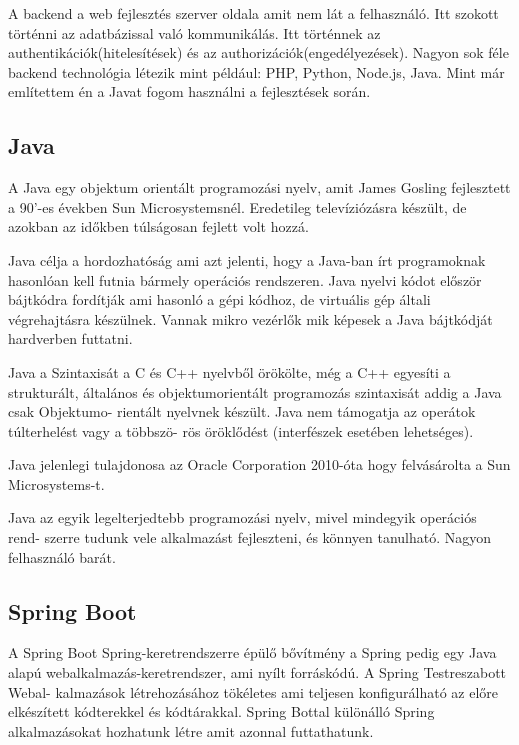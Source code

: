 

A backend a web fejlesztés szerver oldala amit nem lát a felhasználó. Itt szokott történni az adatbázissal való kommunikálás. Itt történnek az authentikációk(hitelesítések) és az authorizációk(engedélyezések). Nagyon sok féle backend technológia létezik mint például: PHP, Python, Node.js, Java. Mint már említettem én a Javat fogom használni a fejlesztések során.

\subsection{Java}

A Java egy objektum orientált programozási nyelv, amit James Gosling fejlesztett a 90’-es években Sun Microsystemsnél. Eredetileg televíziózásra készült, de azokban az időkben túlságosan fejlett volt hozzá.

Java célja a hordozhatóság ami azt jelenti, hogy a Java-ban írt programoknak hasonlóan kell futnia bármely operációs rendszeren. Java nyelvi kódot először bájtkódra fordítják ami hasonló a gépi kódhoz, de virtuális gép általi végrehajtásra készülnek. Vannak mikro vezérlők mik képesek a Java bájtkódját hardverben futtatni.

Java a Szintaxisát a C és C++ nyelvből örökölte, még a C++ egyesíti a strukturált, általános és objektumorientált programozás szintaxisát addig a Java csak Objektumo-
rientált nyelvnek készült. Java nem támogatja az operátok túlterhelést vagy a többszö-
rös öröklődést (interfészek esetében lehetséges).

Java jelenlegi tulajdonosa az Oracle Corporation 2010-óta hogy felvásárolta a Sun Microsystems-t.

Java az egyik legelterjedtebb programozási nyelv, mivel mindegyik operációs rend-
szerre tudunk vele alkalmazást fejleszteni, és könnyen tanulható. Nagyon felhasználó barát.

\subsection{Spring Boot}

A Spring Boot Spring-keretrendszerre épülő bővítmény a Spring pedig egy Java alapú webalkalmazás-keretrendszer, ami nyílt forráskódú. A Spring Testreszabott Webal-
kalmazások létrehozásához tökéletes ami teljesen konfigurálható az előre elkészített kódterekkel és kódtárakkal. Spring Bottal különálló Spring alkalmazásokat hozhatunk létre amit azonnal futtathatunk.

